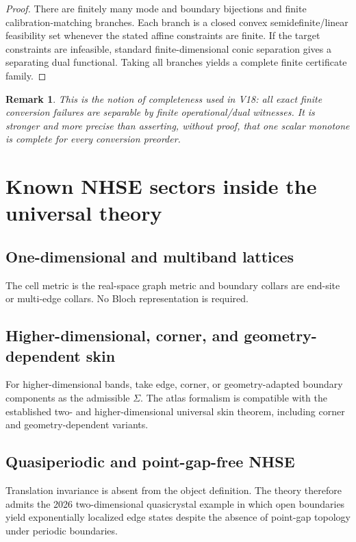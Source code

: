 \documentclass[11pt]{article}
\newtheorem{remark}{Remark}
\begin{document}
\begin{proof}
There are finitely many mode and boundary bijections and finite calibration-matching branches. Each branch is a closed convex semidefinite/linear feasibility set whenever the stated affine constraints are finite. If the target constraints are infeasible, standard finite-dimensional conic separation gives a separating dual functional. Taking all branches yields a complete finite certificate family.
\end{proof}

\begin{remark}
This is the notion of completeness used in V18: all exact finite conversion failures are separable by finite operational/dual witnesses. It is stronger and more precise than asserting, without proof, that one scalar monotone is complete for every conversion preorder.
\end{remark}

\section{Known NHSE sectors inside the universal theory}

\subsection{One-dimensional and multiband lattices}
The cell metric is the real-space graph metric and boundary collars are end-site or multi-edge collars. No Bloch representation is required.

\subsection{Higher-dimensional, corner, and geometry-dependent skin}
For higher-dimensional bands, take edge, corner, or geometry-adapted boundary components as the admissible \(\Sigma\). The atlas formalism is compatible with the established two- and higher-dimensional universal skin theorem, including corner and geometry-dependent variants. \cite{Universal2D}

\subsection{Quasiperiodic and point-gap-free NHSE}
Translation invariance is absent from the object definition. The theory therefore admits the 2026 two-dimensional quasicrystal example in which open boundaries yield exponentially localized edge states despite the absence of point-gap topology under periodic boundaries. \cite{QuasicrystalNHSE}
\end{document}
